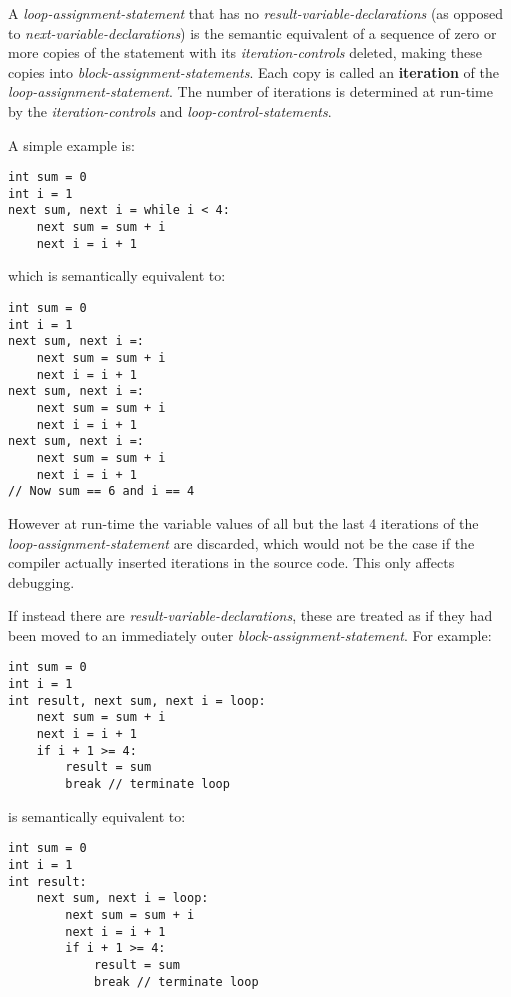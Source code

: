 \documentclass[12pt]{article}
\newcommand{\key}[1]{{\rm \bfseries #1}}
\newenvironment{indpar}[1][0.3in]%
	{\begin{list}{}%
		     {\setlength{\itemsep}{0in}%
		      \setlength{\topsep}{0in}%
		      \setlength{\parsep}{1ex}%
		      \setlength{\labelwidth}{#1}%
		      \setlength{\leftmargin}{#1}%
		      \addtolength{\leftmargin}{\labelsep}}%
	 \item}%
	{\end{list}}
\begin{document}
A {\em loop-assignment-statement} that has no {\em result-variable-declarations}
(as opposed to {\em next-variable-declarations})
is the semantic equivalent of
a sequence of zero or more copies of the statement with
its {\em iteration-controls} deleted, making these copies into
{\em block-assignment-statements}.  Each copy is called an
\key{iteration} of the {\em loop-assignment-statement}.
The number of iterations is
determined at run-time by the {\em iteration-controls}
and {\em loop-control-statements}.

A simple example is:
\begin{indpar}\begin{verbatim}
int sum = 0
int i = 1
next sum, next i = while i < 4:
    next sum = sum + i
    next i = i + 1
\end{verbatim}\end{indpar}
which is semantically equivalent to:
\begin{indpar}\begin{verbatim}
int sum = 0
int i = 1
next sum, next i =:
    next sum = sum + i
    next i = i + 1
next sum, next i =:
    next sum = sum + i
    next i = i + 1
next sum, next i =:
    next sum = sum + i
    next i = i + 1
// Now sum == 6 and i == 4
\end{verbatim}\end{indpar}

However at run-time the variable values of all but the
last 4 iterations of the {\em loop-assignment-statement}
are discarded, which would not be the case if the compiler
actually inserted iterations in the source code.
This only affects debugging.

If instead there are {\em result-variable-declarations}, these are
treated as if they had been moved to an immediately outer
{\em block-assignment-statement}.  For example:
\begin{indpar}\begin{verbatim}
int sum = 0
int i = 1
int result, next sum, next i = loop:
    next sum = sum + i
    next i = i + 1
    if i + 1 >= 4:
        result = sum
        break // terminate loop
\end{verbatim}\end{indpar}
is semantically equivalent to:
\begin{indpar}\begin{verbatim}
int sum = 0
int i = 1
int result:
    next sum, next i = loop:
        next sum = sum + i
        next i = i + 1
        if i + 1 >= 4:
            result = sum
            break // terminate loop
\end{verbatim}\end{indpar}
\end{document}
